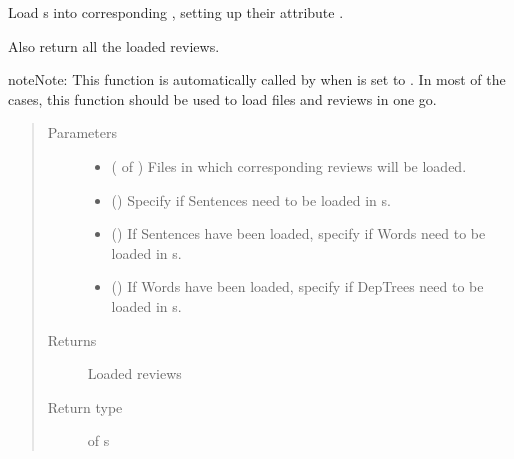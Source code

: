 \documentclass[letterpaper,10pt,english]{sphinxmanual}
\begin{document}
\begin{fulllineitems}
\label{\detokenize{index:loacore.load.review_load.load_reviews_in_files}}
Load  s into corresponding , setting up their attribute .

Also return all the loaded reviews.

\begin{sphinxadmonition}{note}{Note:}
This function is automatically called by  when  is set to
. In most of the cases, this function should be used to load files and reviews in one go.
\end{sphinxadmonition}
\begin{quote}\begin{description}
\item[{Parameters}] \leavevmode\begin{itemize}
\item {} 
 ( of ) \textendash{} Files in which corresponding reviews will be loaded.

\item {} 
 () \textendash{} Specify if Sentences need to be loaded in  s.

\item {} 
 () \textendash{} If Sentences have been loaded, specify if Words need to be loaded in  s.

\item {} 
 () \textendash{} If Words have been loaded, specify if DepTrees need to be loaded in  s.

\end{itemize}

\item[{Returns}] \leavevmode
Loaded reviews

\item[{Return type}] \leavevmode
{} of  s

\end{description}\end{quote}

\end{fulllineitems}
\end{document}
